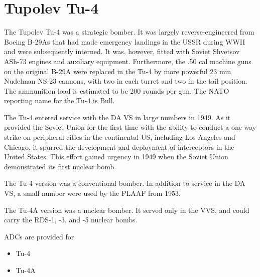 \section*{Tupolev Tu-4}

The Tupolev Tu-4 was a strategic bomber. It was largely reverse-engineered from Boeing B-29As that had made emergency landings in the USSR during WWII and were subsequently interned. It was, however, fitted with Soviet Shvetsov ASh-73 engines and auxiliary equipment. Furthermore, the .50 cal machine guns on the original B-29A were replaced in the Tu-4 by more powerful 23 mm Nudelman NS-23 cannons, with two in each turret and two in the tail position. The ammunition load is estimated to be 200 rounds per gun. The NATO reporting name for the Tu-4 is Bull.

The Tu-4 entered service with the DA VS in large numbers in 1949. As it provided the Soviet Union for the first time with the ability to conduct a one-way strike on peripheral cities in the continental US, including Los Angeles and Chicago, it spurred the development and deployment of interceptors in the United States. This effort gained urgency in 1949 when the Soviet Union demonstrated its first nuclear bomb.

The Tu-4 version was a conventional bomber. In addition to service in the DA VS, a small number were used by the PLAAF from 1953.

The Tu-4A version was a nuclear bomber. It served only in the VVS, and could carry the RDS-1, -3, and -5 nuclear bombs.

ADCs are provided for
\begin{itemize}
    \item Tu-4
    \item Tu-4A
\end{itemize}